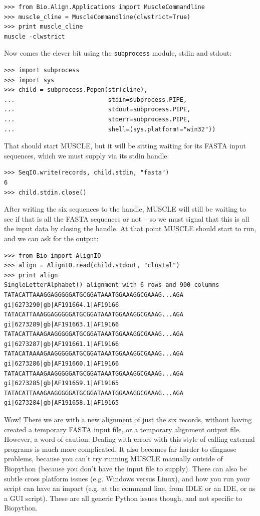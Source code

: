 \documentclass{report}
\begin{document}
\begin{verbatim}
>>> from Bio.Align.Applications import MuscleCommandline
>>> muscle_cline = MuscleCommandline(clwstrict=True)
>>> print muscle_cline
muscle -clwstrict
\end{verbatim}

Now comes the clever bit using the \verb|subprocess| module, stdin and stdout:

\begin{verbatim}
>>> import subprocess
>>> import sys
>>> child = subprocess.Popen(str(cline),
...                          stdin=subprocess.PIPE,
...                          stdout=subprocess.PIPE,
...                          stderr=subprocess.PIPE,
...                          shell=(sys.platform!="win32"))                     
\end{verbatim}

That should start MUSCLE, but it will be sitting waiting for its FASTA input
sequences, which we must supply via its stdin handle:

\begin{verbatim}
>>> SeqIO.write(records, child.stdin, "fasta")
6
>>> child.stdin.close()
\end{verbatim}

After writing the six sequences to the handle, MUSCLE will still be waiting
to see if that is all the FASTA sequences or not -- so we must signal that
this is all the input data by closing the handle. At that point MUSCLE should
start to run, and we can ask for the output:

\begin{verbatim}
>>> from Bio import AlignIO
>>> align = AlignIO.read(child.stdout, "clustal")
>>> print align
SingleLetterAlphabet() alignment with 6 rows and 900 columns
TATACATTAAAGGAGGGGGATGCGGATAAATGGAAAGGCGAAAG...AGA gi|6273290|gb|AF191664.1|AF19166
TATACATTAAAGGAGGGGGATGCGGATAAATGGAAAGGCGAAAG...AGA gi|6273289|gb|AF191663.1|AF19166
TATACATTAAAGAAGGGGGATGCGGATAAATGGAAAGGCGAAAG...AGA gi|6273287|gb|AF191661.1|AF19166
TATACATAAAAGAAGGGGGATGCGGATAAATGGAAAGGCGAAAG...AGA gi|6273286|gb|AF191660.1|AF19166
TATACATTAAAGAAGGGGGATGCGGATAAATGGAAAGGCGAAAG...AGA gi|6273285|gb|AF191659.1|AF19165
TATACATTAAAGAAGGGGGATGCGGATAAATGGAAAGGCGAAAG...AGA gi|6273284|gb|AF191658.1|AF19165
\end{verbatim}

Wow! There we are with a new alignment of just the six records, without having created
a temporary FASTA input file, or a temporary alignment output file. However, a word of
caution: Dealing with errors with this style of calling external programs is much more
complicated.
It also becomes far harder to diagnose problems, because you can't try running MUSCLE
manually outside of Biopython (because you don't have the input file to supply).
There can also be subtle cross platform issues (e.g. Windows versus Linux), and how
you run your script can have an impact (e.g. at the command line, from IDLE or an
IDE, or as a GUI script). These are all generic Python issues though, and not
specific to Biopython.
\end{document}
